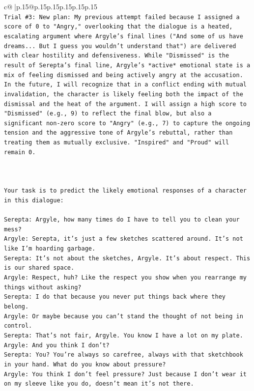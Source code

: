 \documentclass{article}
\begin{document}
{\begin{supertabular}{c@{$\;$}|p{.15\linewidth}@{}p{.15\linewidth}p{.15\linewidth}p{.15\linewidth}p{.15\linewidth}p{.15\linewidth}}
{{{\\ 
\texttt{Trial \#3: New plan: My previous attempt failed because I assigned a score of 0 to "Angry," overlooking that the dialogue is a heated, escalating argument where Argyle's final lines ("And some of us have dreams... But I guess you wouldn't understand that") are delivered with clear hostility and defensiveness. While "Dismissed" is the result of Serepta's final line, Argyle's *active* emotional state is a mix of feeling dismissed and being actively angry at the accusation. In the future, I will recognize that in a conflict ending with mutual invalidation, the character is likely feeling both the impact of the dismissal and the heat of the argument. I will assign a high score to "Dismissed" (e.g., 9) to reflect the final blow, but also a significant non{-}zero score to "Angry" (e.g., 7) to capture the ongoing tension and the aggressive tone of Argyle's rebuttal, rather than treating them as mutually exclusive. "Inspired" and "Proud" will remain 0.} \\
\\ 
\\ 
\\ 
\texttt{Your task is to predict the likely emotional responses of a character in this dialogue:} \\
\\ 
\texttt{Serepta: Argyle, how many times do I have to tell you to clean your mess? } \\
\texttt{Argyle: Serepta, it's just a few sketches scattered around. It's not like I'm hoarding garbage.} \\
\texttt{Serepta: It's not about the sketches, Argyle. It's about respect. This is our shared space.} \\
\texttt{Argyle: Respect, huh? Like the respect you show when you rearrange my things without asking?} \\
\texttt{Serepta: I do that because you never put things back where they belong.} \\
\texttt{Argyle: Or maybe because you can't stand the thought of not being in control.} \\
\texttt{Serepta: That's not fair, Argyle. You know I have a lot on my plate.} \\
\texttt{Argyle: And you think I don't? } \\
\texttt{Serepta: You? You're always so carefree, always with that sketchbook in your hand. What do you know about pressure?} \\
\texttt{Argyle: You think I don't feel pressure? Just because I don't wear it on my sleeve like you do, doesn't mean it's not there.} \\
}}}
\end{supertabular}}
\end{document}

